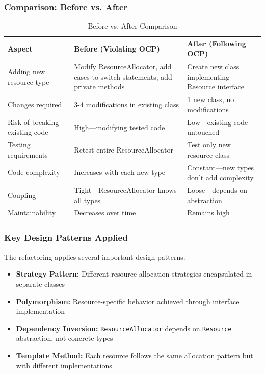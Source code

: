 \subsubsection{Comparison: Before vs. After}

\begin{table}[H]
\centering
\begin{tabular}{|p{5cm}|p{5cm}|p{5cm}|}
\hline
\textbf{Aspect} & \textbf{Before (Violating OCP)} & \textbf{After (Following OCP)} \\
\hline
Adding new resource type & Modify ResourceAllocator, add cases to switch statements, add private methods & Create new class implementing Resource interface \\
\hline
Changes required & 3-4 modifications in existing class & 1 new class, no modifications \\
\hline
Risk of breaking existing code & High—modifying tested code & Low—existing code untouched \\
\hline
Testing requirements & Retest entire ResourceAllocator & Test only new resource class \\
\hline
Code complexity & Increases with each new type & Constant—new types don't add complexity \\
\hline
Coupling & Tight—ResourceAllocator knows all types & Loose—depends on abstraction \\
\hline
Maintainability & Decreases over time & Remains high \\
\hline
\end{tabular}
\caption{Before vs. After Comparison}
\label{tab:ocp_comparison}
\end{table}

\subsubsection{Key Design Patterns Applied}

The refactoring applies several important design patterns:

\begin{itemize}
    \item \textbf{Strategy Pattern:} Different resource allocation strategies encapsulated in separate classes
    \item \textbf{Polymorphism:} Resource-specific behavior achieved through interface implementation
    \item \textbf{Dependency Inversion:} \texttt{ResourceAllocator} depends on \texttt{Resource} abstraction, not concrete types
    \item \textbf{Template Method:} Each resource follows the same allocation pattern but with different implementations
\end{itemize}

